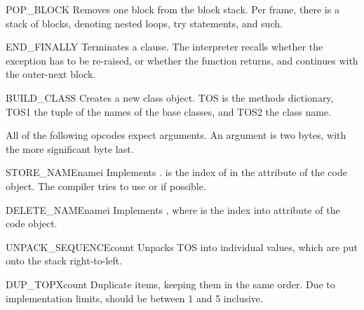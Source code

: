 \begin{opcodedesc}{POP_BLOCK}{}
Removes one block from the block stack.  Per frame, there is a 
stack of blocks, denoting nested loops, try statements, and such.
\end{opcodedesc}

\begin{opcodedesc}{END_FINALLY}{}
Terminates a  clause.  The interpreter recalls
whether the exception has to be re-raised, or whether the function
returns, and continues with the outer-next block.
\end{opcodedesc}

\begin{opcodedesc}{BUILD_CLASS}{}
Creates a new class object.  TOS is the methods dictionary, TOS1
the tuple of the names of the base classes, and TOS2 the class name.
\end{opcodedesc}

All of the following opcodes expect arguments.  An argument is two
bytes, with the more significant byte last.

\begin{opcodedesc}{STORE_NAME}{namei}
Implements .  is the index of 
in the attribute  of the code object.
The compiler tries to use  or 
if possible.
\end{opcodedesc}

\begin{opcodedesc}{DELETE_NAME}{namei}
Implements , where  is the index into
 attribute of the code object.
\end{opcodedesc}

\begin{opcodedesc}{UNPACK_SEQUENCE}{count}
Unpacks TOS into  individual values, which are put onto
the stack right-to-left.
\end{opcodedesc}



\begin{opcodedesc}{DUP_TOPX}{count}
Duplicate  items, keeping them in the same order. Due to
implementation limits,  should be between 1 and 5 inclusive.
\end{opcodedesc}

